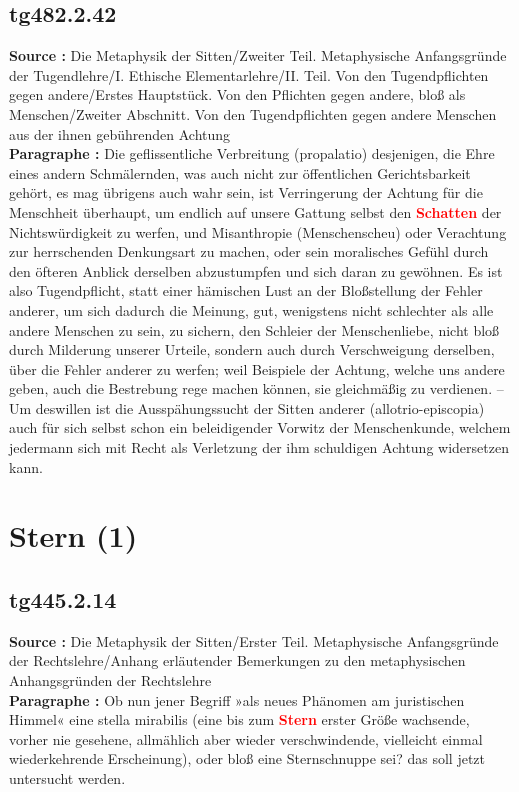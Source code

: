 \documentclass[a4paper,12pt,twoside]{book}
\newcommand{\match}[1]{\textcolor{red}{\textbf{#1}}}
\newcommand{\unnumberedsection}[1]{
	\section*{#1}
	\addcontentsline{toc}{section}{#1}
	\markright{#1}
}
\begin{document}
	\subsection*{tg482.2.42} 
	\textbf{Source : }Die Metaphysik der Sitten/Zweiter Teil. Metaphysische Anfangsgründe der Tugendlehre/I. Ethische Elementarlehre/II. Teil. Von den Tugendpflichten gegen andere/Erstes Hauptstück. Von den Pflichten gegen andere, bloß als Menschen/Zweiter Abschnitt. Von den Tugendpflichten gegen andere Menschen aus der ihnen gebührenden Achtung\\  
	
	\textbf{Paragraphe : }Die geflissentliche Verbreitung (propalatio) desjenigen, die Ehre eines andern Schmälernden, was auch nicht zur öffentlichen Gerichtsbarkeit gehört, es mag übrigens auch wahr sein, ist Verringerung der Achtung für die Menschheit überhaupt, um endlich auf unsere Gattung selbst den \match{Schatten} der Nichtswürdigkeit zu werfen, und Misanthropie (Menschenscheu) oder Verachtung zur herrschenden Denkungsart zu machen, oder sein moralisches Gefühl durch den öfteren Anblick derselben abzustumpfen und sich daran zu gewöhnen. Es ist also Tugendpflicht, statt einer hämischen Lust an der Bloßstellung der Fehler anderer, um sich dadurch die Meinung, gut, wenigstens nicht schlechter als alle andere Menschen zu sein, zu sichern, den Schleier der Menschenliebe, nicht bloß durch Milderung unserer Urteile, sondern auch durch Verschweigung derselben, über die Fehler anderer zu werfen; weil Beispiele der Achtung, welche uns andere geben, auch die Bestrebung rege machen können, sie gleichmäßig zu verdienen. – Um deswillen ist die Ausspähungssucht der Sitten anderer (allotrio-episcopia) auch für sich selbst schon ein beleidigender Vorwitz der Menschenkunde, welchem jedermann sich mit Recht als Verletzung der ihm schuldigen Achtung widersetzen kann. 
	
	\unnumberedsection{Stern (1)} 
	\subsection*{tg445.2.14} 
	\textbf{Source : }Die Metaphysik der Sitten/Erster Teil. Metaphysische Anfangsgründe der Rechtslehre/Anhang erläutender Bemerkungen zu den metaphysischen Anhangsgründen der Rechtslehre\\  
	
	\textbf{Paragraphe : }Ob nun jener Begriff »als neues Phänomen am juristischen Himmel« eine stella mirabilis (eine bis zum \match{Stern} erster Größe wachsende, vorher nie gesehene, allmählich aber wieder verschwindende,  vielleicht einmal wiederkehrende Erscheinung), oder bloß eine Sternschnuppe sei? das soll jetzt untersucht werden. 
	
\end{document}
